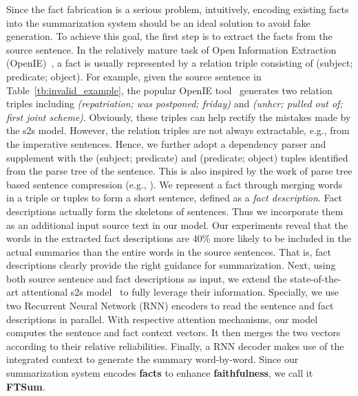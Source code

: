 \documentclass[letterpaper]{article} \usepackage{aaai18}  \usepackage{times}  \usepackage{helvet}  \usepackage{courier}  \usepackage{url}  \usepackage{graphicx}  \usepackage{amsfonts}
\begin{document}
Since the fact fabrication is a serious problem, intuitively, encoding existing facts into the summarization system should be an ideal solution to avoid fake generation.
	To achieve this goal, the first step is to extract the facts from the source sentence.
	In the relatively mature task of Open Information Extraction (OpenIE)~\cite{banko2007open}, a fact is usually represented by a relation triple consisting of (subject; predicate; object).
	For example, given the source sentence in Table~\ref{tb:invalid_example}, the popular OpenIE tool~\cite{angeli2015leveraging} generates two relation triples including \textit{(repatriation; was postponed; friday)} and \textit{(unhcr; pulled out of; first joint scheme)}.
Obviously, these triples can help rectify the mistakes made by the s2s model.
	However, the relation triples are not always extractable, e.g., from the imperative sentences.
Hence, we further adopt a dependency parser and supplement with the (subject; predicate) and (predicate; object) tuples identified from the parse tree of the sentence.  
This is also inspired by the work of parse tree based sentence compression (e.g., \cite{knight2002summarization}).
We represent a fact through merging words in a triple or tuples to form a short sentence, defined as a \textit{fact description}.
	Fact descriptions actually form the skeletons of sentences.
	Thus we incorporate them as an additional input source text in our model.
Our experiments reveal that the words in the extracted fact descriptions are 40\% more likely to be included in the actual summaries than the entire words in the source sentences.
	That is, fact descriptions clearly provide the right guidance for summarization.
	Next, using both source sentence and fact descriptions as input, we extend the state-of-the-art attentional s2s model~\cite{nallapati2016abstractive} to fully leverage their information.
Specially, we use two Recurrent Neural Network (RNN) encoders to read the sentence and fact descriptions in parallel.
	With respective attention mechanisms, our model computes the sentence and fact context vectors.
	It then merges the two vectors according to their relative reliabilities.
Finally, a RNN decoder makes use of the integrated context to generate the summary word-by-word.
	Since our summarization system encodes \textbf{facts} to enhance \textbf{faithfulness}, we call it \textbf{FTSum}.
	
\end{document}
